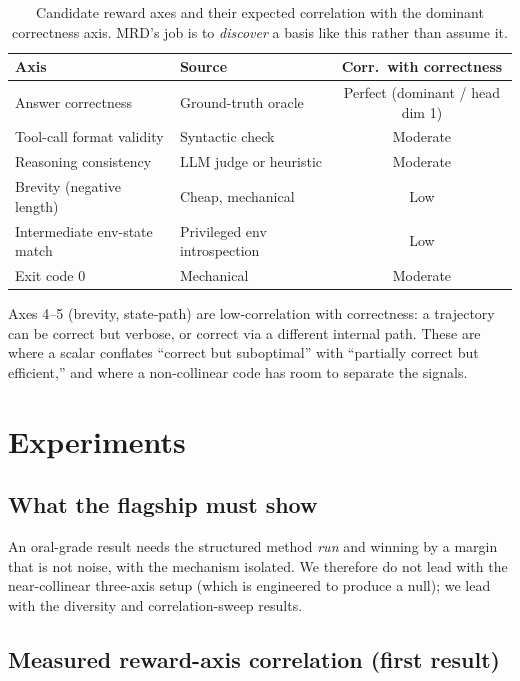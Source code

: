 \documentclass[11pt,a4paper]{article}
\begin{document}
\begin{table}[h]
\centering
\caption{Candidate reward axes and their expected correlation with the
dominant correctness axis.  MRD's job is to \emph{discover} a basis like
this rather than assume it.}
\label{tab:axes}
\begin{tabular}{@{}llc@{}}
\toprule
\textbf{Axis} & \textbf{Source} & \textbf{Corr.\ with correctness} \\
\midrule
Answer correctness & Ground-truth oracle & Perfect (dominant / head dim 1) \\
Tool-call format validity & Syntactic check & Moderate \\
Reasoning consistency & LLM judge or heuristic & Moderate \\
Brevity (negative length) & Cheap, mechanical & Low \\
Intermediate env-state match & Privileged env introspection & Low \\
Exit code 0 & Mechanical & Moderate \\
\bottomrule
\end{tabular}
\end{table}

Axes 4--5 (brevity, state-path) are low-correlation with correctness: a
trajectory can be correct but verbose, or correct via a different internal
path.  These are where a scalar conflates ``correct but suboptimal'' with
``partially correct but efficient,'' and where a non-collinear code has room
to separate the signals.

\section{Experiments}
\label{sec:exp}

\subsection{What the flagship must show}

An oral-grade result needs the structured method \emph{run} and winning by a
margin that is not noise, with the mechanism isolated.  We therefore do not
lead with the near-collinear three-axis setup (which is engineered to
produce a null); we lead with the diversity and correlation-sweep results.

\subsection{Measured reward-axis correlation (first result)}
\label{sec:exp-corr}
\end{document}
